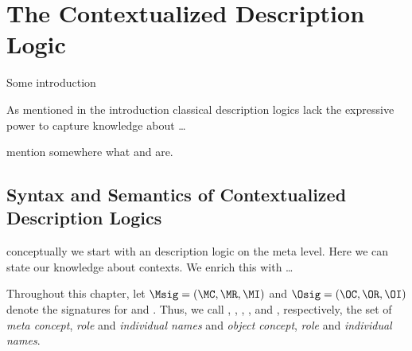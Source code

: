 \chapter{The Contextualized Description Logic \texorpdfstring{\LMLO}{LM[LO]}}
\label{cha:context-dls}



Some introduction

As mentioned in the introduction classical description logics lack the expressive power to capture
knowledge about \ldots

mention somewhere what \LM and \LO are.



\section{Syntax and Semantics of Contextualized Description Logics}
\label{sec:syn-seman-cdl}

conceptually we start with an description logic \LM on the meta level. Here we can state our
knowledge about contexts. We enrich this with \ldots 



Throughout this chapter, let $\Msig = (\MC, \MR, \MI)$ and $\Osig = (\OC, \OR, \OI)$ denote the
signatures for \LM and \LO. Thus, we call \MC, \MR, \MI, \OC, \OR and \OI, respectively, the set of
\emph{meta concept}, \emph{role} and \emph{individual names} and \emph{object concept}, \emph{role}
and \emph{individual names}.

